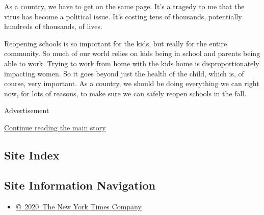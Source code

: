 As a country, we have to get on the same page. It's a tragedy to me that
the virus has become a political issue. It's costing tens of thousands,
potentially hundreds of thousands, of lives.

Reopening schools is so important for the kids, but really for the
entire community. So much of our world relies on kids being in school
and parents being able to work. Trying to work from home with the kids
home is disproportionately impacting women. So it goes beyond just the
health of the child, which is, of course, very important. As a country,
we should be doing everything we can right now, for lots of reasons, to
make sure we can safely reopen schools in the fall.

Advertisement

\protect\hyperlink{after-bottom}{Continue reading the main story}

\hypertarget{site-index}{%
\subsection{Site Index}\label{site-index}}

\hypertarget{site-information-navigation}{%
\subsection{Site Information
Navigation}\label{site-information-navigation}}

\begin{itemize}
\tightlist
\item
  \href{https://help.nytimes3xbfgragh.onion/hc/en-us/articles/115014792127-Copyright-notice}{©~2020~The
  New York Times Company}
\end{itemize}

